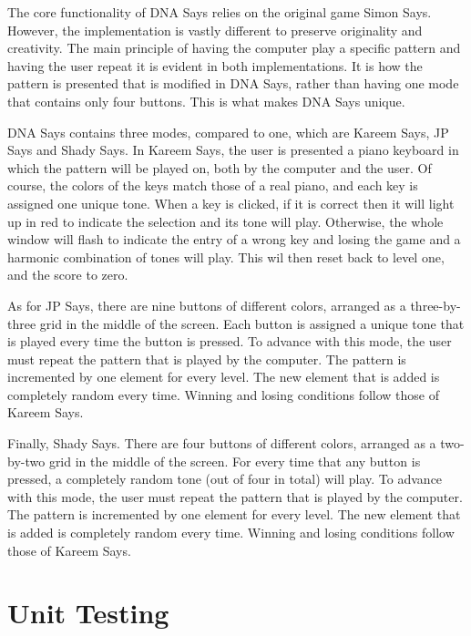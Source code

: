 \documentclass[12pt, titlepage]{article}
\begin{document}
\par The core functionality of DNA Says relies on the original game Simon Says. However, the implementation is vastly different to preserve originality and creativity. The main principle of having the computer play a specific pattern and having the user repeat it is evident in both implementations. It is how the pattern is presented that is modified in DNA Says, rather than having one mode that contains only four buttons. This is what makes DNA Says unique. 
\\
\par DNA Says contains three modes, compared to one, which are Kareem Says, JP Says and Shady Says. In Kareem Says, the user is presented a piano keyboard in which the pattern will be played on, both by the computer and the user. Of course, the colors of the keys match those of a real piano, and each key is assigned one unique tone. When a key is clicked, if it is correct then it will light up in red to indicate the selection and its tone will play. Otherwise, the whole window will flash to indicate the entry of a wrong key and losing the game and a harmonic combination of tones will play. This wil then reset back to level one, and the score to zero.
\\
\par As for JP Says, there are nine buttons of different colors, arranged as a three-by-three grid in the middle of the screen. Each button is assigned a unique tone that is played every time the button is pressed. To advance with this mode, the user must repeat the pattern that is played by the computer. The pattern is incremented by one element for every level. The new element that is added is completely random every time. Winning and losing conditions follow those of Kareem Says.
\\
\par Finally, Shady Says. There are four buttons of different colors, arranged as a two-by-two grid in the middle of the screen. For every time that any button is pressed, a completely random tone (out of four in total) will play. To advance with this mode, the user must repeat the pattern that is played by the computer. The pattern is incremented by one element for every level. The new element that is added is completely random every time. Winning and losing conditions follow those of Kareem Says.


\section{Unit Testing}
\end{document}
